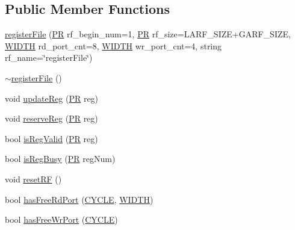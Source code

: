 \subsection*{Public Member Functions}
\begin{DoxyCompactItemize}
\item 
\hyperlink{classregisterFile_aa9071035e97a10e7e76990c9b5e126fb}{registerFile} (\hyperlink{global_2global_8h_a54dcae2ba04c76c12afe113b706bd4dc}{PR} rf\_\-begin\_\-num=1, \hyperlink{global_2global_8h_a54dcae2ba04c76c12afe113b706bd4dc}{PR} rf\_\-size=LARF\_\-SIZE+GARF\_\-SIZE, \hyperlink{global_2global_8h_a6fa2e24b8a418fa215e183264cbea3aa}{WIDTH} rd\_\-port\_\-cnt=8, \hyperlink{global_2global_8h_a6fa2e24b8a418fa215e183264cbea3aa}{WIDTH} wr\_\-port\_\-cnt=4, string rf\_\-name=\char`\"{}registerFile\char`\"{})
\item 
\hyperlink{classregisterFile_a51d44388ce9baf55f5d0fc108198d915}{$\sim$registerFile} ()
\item 
void \hyperlink{classregisterFile_a57aa14508810da286ee60ef6cd033d6b}{updateReg} (\hyperlink{global_2global_8h_a54dcae2ba04c76c12afe113b706bd4dc}{PR} reg)
\item 
void \hyperlink{classregisterFile_a2731695462957c3ac0a8888e7fce3bd3}{reserveReg} (\hyperlink{global_2global_8h_a54dcae2ba04c76c12afe113b706bd4dc}{PR} reg)
\item 
bool \hyperlink{classregisterFile_a67c6a74ba45a273b0c57e29fe9cfc4eb}{isRegValid} (\hyperlink{global_2global_8h_a54dcae2ba04c76c12afe113b706bd4dc}{PR} reg)
\item 
bool \hyperlink{classregisterFile_af4bc17e8db0bd9a07fec85814e1d607f}{isRegBusy} (\hyperlink{global_2global_8h_a54dcae2ba04c76c12afe113b706bd4dc}{PR} regNum)
\item 
void \hyperlink{classregisterFile_a9e487acbcecb5a905a4ee1c80adf48e4}{resetRF} ()
\item 
bool \hyperlink{classregisterFile_a2f83eaee77e90587c8fabff35b6255c3}{hasFreeRdPort} (\hyperlink{global_2global_8h_a7e19a550ec11d1ed921deb20c22efb5b}{CYCLE}, \hyperlink{global_2global_8h_a6fa2e24b8a418fa215e183264cbea3aa}{WIDTH})
\item 
bool \hyperlink{classregisterFile_a5c361b0e1c0ec3e6f08990b63ffae8db}{hasFreeWrPort} (\hyperlink{global_2global_8h_a7e19a550ec11d1ed921deb20c22efb5b}{CYCLE})
\end{DoxyCompactItemize}


